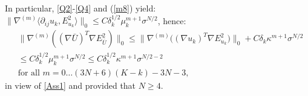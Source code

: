\documentclass[reqno,twoside,11pt]{amsart}
\numberwithin{equation}{section}
\theoremstyle{plain}
\theoremstyle{definition}
\begin{document}
In particular, \ref{Q2}-\ref{Q4}  and (\ref{m8}) yield:
$\|\nabla^{(m)}\langle \partial_{ij}u_k, E^2_{u_k}\rangle\|_0 \leq
C\delta_k^{1/2}\mu_k^{m+1}\sigma^{N/2}$, hence:
\begin{equation}\label{Q1Udgr}
\begin{split}
& \|\nabla^{(m)}((\nabla \bar U)^T\nabla E_{\bar U}^2)\|_0
 \leq \|\nabla^{(m)}\big((\nabla u_k)^T\nabla E^2_{u_k}\big)\|_0 + C\delta_k\kappa^{m+1}\sigma^{N/2}
\\ & \leq C\delta_k^{1/2}\mu_k^{m+1}\sigma^{N/2} \leq C \delta_k^{1/2}\kappa^{m+1}\sigma^{N/2-2}
\\ & \mbox{for all } m=0\ldots (3N+6)(K-k)-3N-3,
\end{split}
\end{equation}
in view of \ref{Ass1} and provided that $N\geq 4$.

\smallskip
\end{document}
